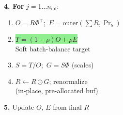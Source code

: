 \documentclass[8pt]{article}
\newlength{\colw}
\begin{document}
\begin{minipage}[t]{\colw}
\begin{keyboxG}
\textbf{4. For} $j=1\ldots n_\text{ipf}$:
\begin{enumerate}[leftmargin=1em, itemsep=0pt, topsep=1pt, parsep=0pt]
\item $O\!=\!R\Phi^\top$;\ $E\!=\!\text{outer}(\sum R,\Pr_b)$
\item \colorbox{lightgreen}{$T\!=\!(1\!-\!\rho)O+\rho E$}\\
    {\scriptsize\color{added} Soft batch-balance target}
\item $S\!=\!T/O$;\ $G\!=\!S\Phi$ {\scriptsize (scales)}
\item $R\!\gets\!R\!\odot\!G$; renormalize\\
    {\scriptsize (in-place, pre-allocated buf)}
\end{enumerate}
\end{keyboxG}\vspace{1pt}

\begin{stepbox}
\textbf{5.} Update $O$, $E$ from final $R$
\end{stepbox}
\end{minipage}%
\hfill
\end{document}
